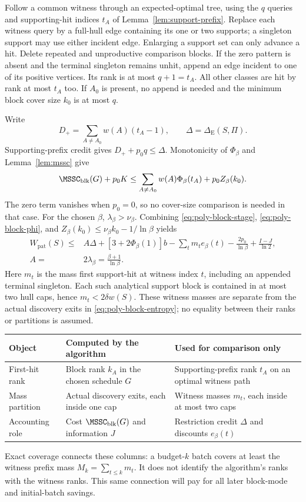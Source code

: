 Follow a common witness through an expected-optimal tree, using the
$q$ queries and supporting-hit indices $t_A$ of
Lemma~\ref{lem:support-prefix}. Replace each witness query by a full-hull
edge containing its one or two supports; a singleton support may use
either incident edge. Enlarging a support set can only advance a hit.
Delete repeated and unproductive comparison blocks. If the zero
pattern is absent and the terminal singleton remains unhit, append an
edge incident to one of its positive vertices. Its rank is at most
$q+1=t_A$. All other classes are hit by rank at most $t_A$ too.
If $A_0$ is present, no append is needed and the minimum block cover
size $k_0$ is at most $q$.

Write
\[
 D_+=\sum_{A\ne A_0}w(A)(t_A-1),\qquad
 \Delta=\Delta_{\mathrm E}(S,\Pi).
\]
Supporting-prefix credit gives $D_++p_0q\le\Delta$.
Monotonicity of $\Phi_\beta$ and Lemma~\ref{lem:mssc} give
\[
 \MSSC_{\mathrm{blk}}(G)+p_0K
 \le\sum_{A\ne A_0}w(A)\Phi_\beta(t_A)+p_0 Z_\beta(k_0).
\]
The zero term vanishes when $p_0=0$, so no cover-size comparison is
needed in that case. For the chosen $\beta$, $\lambda_\beta>\nu_\beta$.
Combining \eqref{eq:poly-block-stage}, \eqref{eq:poly-block-phi}, and
$Z_\beta(k_0)\le\nu_\beta k_0-1/\ln\beta$ yields
\begin{equation}\label{eq:poly-block-discrete}
 \begin{aligned}
 W_{\mathrm{pat}}(S)\le{}&
 A\Delta+[3+2\Phi_\beta(1)]b
 -\sum_t m_t e_\beta(t)-\frac{2p_0}{\ln\beta}
 +\frac{I-J}{\ln2},\\
 A={}&2\lambda_\beta=\frac{\beta+1}{\ln\beta}.
 \end{aligned}
\end{equation}
Here $m_t$ is the mass first support-hit at witness index $t$, including
an appended terminal singleton. Each such analytical support block is
contained in at most two hull caps, hence $m_t<2\delta w(S)$.
These witness masses are separate from the actual discovery exits in
\eqref{eq:poly-block-entropy}; no equality between their ranks or
partitions is assumed.

\begin{center}
\small
\begin{tabular}{@{}p{.25\linewidth}p{.34\linewidth}p{.34\linewidth}@{}}
\hline
Object & Computed by the algorithm & Used for comparison only\\
\hline
First-hit rank & Block rank $k_A$ in the chosen schedule $G$
 & Supporting-prefix rank $t_A$ on an optimal witness path\\
Mass partition & Actual discovery exits, each inside one cap
 & Witness masses $m_t$, each inside at most two caps\\
Accounting role & Cost $\MSSC_{\rm blk}(G)$ and information $J$
 & Restriction credit $\Delta$ and discounts $e_\beta(t)$\\
\hline
\end{tabular}
\end{center}
Exact coverage connects these columns: a budget-$k$ batch covers at
least the witness prefix mass $M_k=\sum_{t\le k}m_t$. It does not
identify the algorithm's ranks with the witness ranks. This same
connection will pay for all later block-mode and initial-batch savings.

